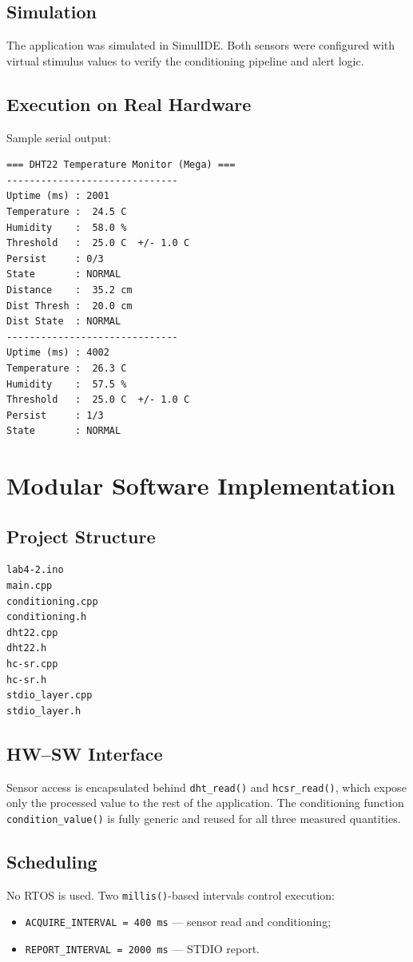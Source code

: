 \documentclass[12pt,a4paper]{article}
\begin{document}
\subsection{Simulation}
The application was simulated in SimulIDE. Both sensors were configured with virtual
stimulus values to verify the conditioning pipeline and alert logic.

\subsection{Execution on Real Hardware}
Sample serial output:
\begin{lstlisting}
=== DHT22 Temperature Monitor (Mega) ===
------------------------------
Uptime (ms) : 2001
Temperature :  24.5 C
Humidity    :  58.0 %
Threshold   :  25.0 C  +/- 1.0 C
Persist     : 0/3
State       : NORMAL
Distance    :  35.2 cm
Dist Thresh :  20.0 cm
Dist State  : NORMAL
------------------------------
Uptime (ms) : 4002
Temperature :  26.3 C
Humidity    :  57.5 %
Threshold   :  25.0 C  +/- 1.0 C
Persist     : 1/3
State       : NORMAL
\end{lstlisting}

\section{Modular Software Implementation}

\subsection{Project Structure}
\begin{lstlisting}
lab4-2.ino
main.cpp
conditioning.cpp
conditioning.h
dht22.cpp
dht22.h
hc-sr.cpp
hc-sr.h
stdio_layer.cpp
stdio_layer.h
\end{lstlisting}

\subsection{HW--SW Interface}
Sensor access is encapsulated behind \texttt{dht\_read()} and \texttt{hcsr\_read()},
which expose only the processed value to the rest of the application.
The conditioning function \texttt{condition\_value()} is fully generic and reused
for all three measured quantities.

\subsection{Scheduling}
No RTOS is used. Two \texttt{millis()}-based intervals control execution:
\begin{itemize}
    \item \texttt{ACQUIRE\_INTERVAL = 400\,ms} — sensor read and conditioning;
    \item \texttt{REPORT\_INTERVAL = 2000\,ms} — STDIO report.
\end{itemize}
\end{document}
